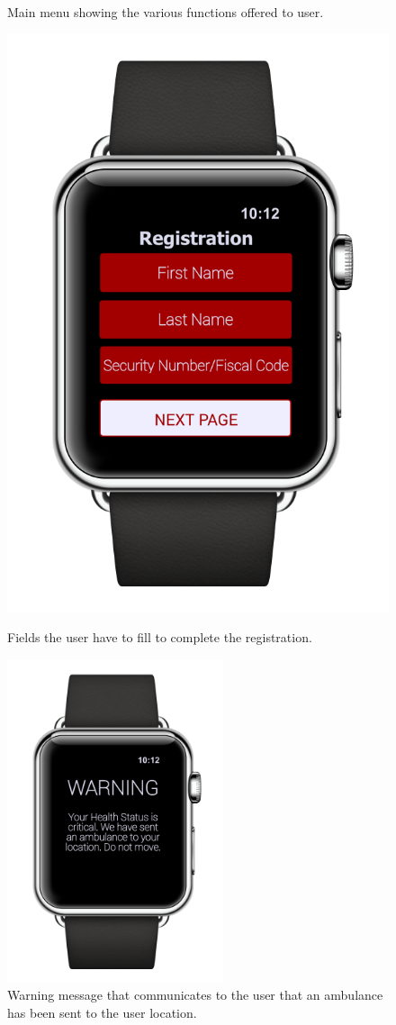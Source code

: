 \begin{enumerate}
\begin{figure}[H]
\begin{center}
\begin{minipage}[c]{.40\textwidth}
	\caption{Main menu showing the various functions offered to user.}
        \end{minipage}
      \end{center}
\end{figure}
\begin{figure}[H]
\begin{center}
        \begin{minipage}[c]{.35\textwidth}
	\centering
          \includegraphics[height=9.5  cm]{Images/Mockups/AutomatedSOSMockup6.png}
	\caption{Fields the user have to fill to complete the registration.}
        \end{minipage}%
        \hspace{10mm}%
        \begin{minipage}[c]{.40\textwidth}
	\centering
          \includegraphics[height=9.5cm]{Images/Mockups/AutomatedSOSMockup7.png}
	\caption{Warning message that communicates to the user that an ambulance has been sent to the user location.}
        \end{minipage}
      \end{center}
\end{figure}


\end{enumerate}
